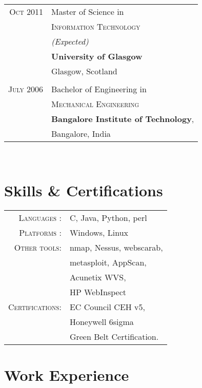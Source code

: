 \documentclass[12pt]{article}
\begin{document}
{\begin{minipage}[t]{0.5\textwidth}
\begin{tabular}{rl}
 	
	\textsc{Oct} 2011 & Master of Science in\\ 
	  &\textsc{Information Technology}\\
	 & \small\emph{(Expected)}\\
	 & \textbf{University of Glasgow}\\
	 & Glasgow, Scotland \\
	 &\\
	\textsc{July} 2006 & Bachelor of Engineering in\\
	 & \textsc{Mechanical Engineering}\\
	 & \textbf{Bangalore Institute of Technology},\\
	 & Bangalore, India\\

\end{tabular}\\[10pt]


\section{Skills \& Certifications}
\begin{tabular}{rl}
	\textsc{Languages} :  & C, Java, Python, perl\\
	\textsc{Platforms} :  & Windows, Linux\\
	\textsc{Other tools}: & nmap, Nessus, webscarab,\\
				       &  metasploit, AppScan, \\ 
					& Acunetix WVS, \\
					& HP WebInspect\\
					
	\textsc{Certifications}: & EC Council CEH v5,\\
					  & Honeywell 6sigma \\ & Green Belt Certification.
	\end{tabular}

\end{minipage} %
\hfill
\begin{minipage}[t]{0.44\textwidth} %
	\vspace{0pt}	%
	
\section{Work Experience}


\end{minipage}}
\end{document}

